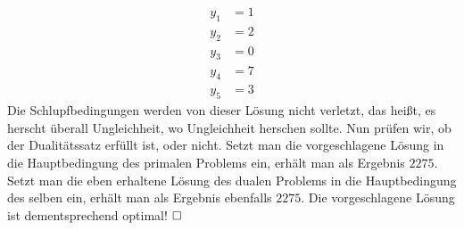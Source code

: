 \documentclass [a4paper,11pt]{article}
\begin{document}
\begin{enumerate}
\begin{enumerate}
\begin{align*}
                        y_1 &= 1\\
                        y_2 &= 2\\
                        y_3 &= 0\\
                        y_4 &= 7\\
                        y_5 &= 3
                    \end{align*}
                    Die Schlupfbedingungen werden von dieser Lösung nicht verletzt, das heißt, es herscht überall Ungleichheit, wo Ungleichheit herschen sollte.
                    Nun prüfen wir, ob der Dualitätssatz erfüllt ist, oder nicht. Setzt man die vorgeschlagene Lösung in die Hauptbedingung des primalen Problems
                    ein, erhält man als Ergebnis $2275$. Setzt man die eben erhaltene Lösung des dualen Problems in die Hauptbedingung des selben ein,
                    erhält man als Ergebnis ebenfalls $2275$. Die vorgeschlagene Lösung ist dementsprechend optimal! $\qed$
            \end{enumerate}

    \end{enumerate}
\end{document}
